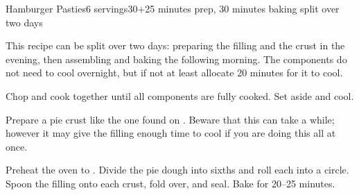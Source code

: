 \documentclass[../Cookbook.tex]{subfiles}
\begin{document}
\begin{recipe}{Hamburger Pasties}{6 servings}{30+25 minutes prep, 30 minutes baking split over two days}

This recipe can be split over two days: preparing the filling and the crust in the evening, then assembling and baking the following morning. The components do not need to cool overnight, but if not at least allocate 20 minutes for it to cool.

Chop and cook together until all components are fully cooked. Set aside and cool.

\newstep
Prepare a pie crust like the one found on . Beware that this can take a while; however it may give the filling enough time to cool if you are doing this all at once.

\newstep
Preheat the oven to .
Divide the pie dough into sixths and roll each into a circle. Spoon the filling onto each crust, fold over, and seal. Bake for 20--25 minutes.

\end{recipe}
\end{document}
